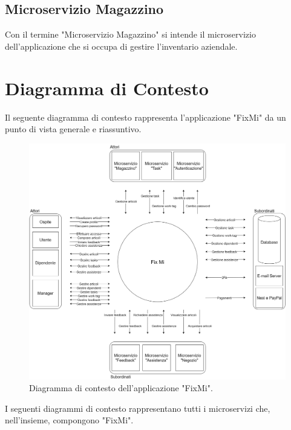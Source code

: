 \documentclass{report}
\begin{document}
\subsection*{Microservizio Magazzino}
Con il termine "Microservizio Magazzino" si intende il microservizio dell'applicazione che si occupa di gestire l'inventario aziendale.


\section{Diagramma di Contesto}

Il seguente diagramma di contesto rappresenta l'applicazione "FixMi" da un punto di vista generale e riassuntivo.

\begin{figure}[H]
	\centering\includegraphics[width=1\textwidth]{images/Diagrammi_Contesto/Diagramma_Contesto_FixMi.png}
	Diagramma di contesto dell'applicazione "FixMi".
\end{figure}

I seguenti diagrammi di contesto rappresentano tutti i microservizi che, nell'insieme, compongono "FixMi".
\end{document}
